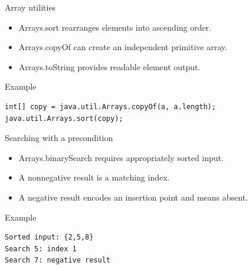 \documentclass[10pt,aspectratio=169]{beamer}
\begin{document}
\begin{frame}[fragile,t]{Array utilities}
\begin{itemize}
\item Arrays.sort rearranges elements into ascending order.
\item Arrays.copyOf can create an independent primitive array.
\item Arrays.toString provides readable element output.
\end{itemize}
\vspace{1mm}\begin{block}{Example}
\begin{lstlisting}
int[] copy = java.util.Arrays.copyOf(a, a.length);
java.util.Arrays.sort(copy);
\end{lstlisting}
\end{block}
\end{frame}

\begin{frame}[fragile,t]{Searching with a precondition}
\begin{itemize}
\item Arrays.binarySearch requires appropriately sorted input.
\item A nonnegative result is a matching index.
\item A negative result encodes an insertion point and means absent.
\end{itemize}
\vspace{1mm}\begin{block}{Example}
\begin{lstlisting}
Sorted input: {2,5,8}
Search 5: index 1
Search 7: negative result
\end{lstlisting}
\end{block}
\end{frame}
\end{document}
